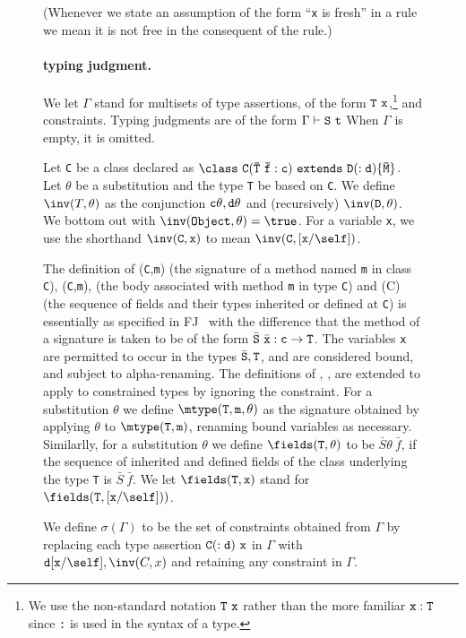 \begin{figure*}
(Whenever we state an assumption of the form ``{\tt x} is
fresh'' in a rule we mean it is not free in the consequent of the
rule.)

\paragraph{\CFJ{} typing judgment.}\label{CFJ-typing}
We let $\Gamma$ stand for multisets of type assertions, of the form
${\tt T\ x}$,\footnote{We use the non-standard notation ${\tt T\ x}$
rather than the more familiar ${\tt x} : {\tt T}$ since {\tt :} is
used in the syntax of a type.}  and constraints. Typing judgments are
of the form $\Gamma\vdash {\tt S\ t}$ When $\Gamma$ is empty, it is
omitted. 

Let {\tt C} be a class declared as ${\tt \class\ C(\bar{\tt T}\
\bar{\tt f}:c)\ extends\ D(:d)\{\bar{\tt M}\}}$. Let
$\theta$ be a substitution and the type {\tt T} be based on {\tt C}.
We define $\inv(T,\theta)$
as the conjunction ${\tt c\theta,d\theta}$ and (recursively)
$\inv({\tt D},\theta)$.  We bottom out with $\inv({\tt
Object},\theta)=\true$. For a variable {\tt x}, we use the shorthand
$\inv({\tt C},{\tt x})$ to mean $\inv({\tt C},[{\tt x}/\self])$.

The definition of {\mtype({\tt C},{\tt m})} (the signature of a method
named {\tt m} in class {\tt C}), {\mbody({\tt C},{\tt m})}, (the body
associated with method {\tt m} in type {\tt C}) and \fields(C) (the
sequence of fields and their types inherited or defined at {\tt C}) is
essentially as specified in FJ~\cite{FJ} with the difference that the
method of a signature is taken to be of the form $\bar{\tt S}\ \bar{\tt
x}: {\tt c} \rightarrow {\tt T}$.  The variables {\tt x} are permitted
to occur in the types $\bar{\tt S},{\tt T}$, and are considered bound,
and subject to alpha-renaming.  The definitions of \mtype, \mbody,
\fields{} are extended to apply to constrained types by ignoring the
constraint.  For a substitution $\theta$ we define $\mtype({\tt
T},{\tt m},\theta)$ as the signature obtained by applying $\theta$ to
$\mtype({\tt T},{\tt m})$, renaming bound variables as necessary.
Similarlly, for a substitution $\theta$ we define $\fields({\tt
T},\theta)$ to be $\bar{S}\theta\ \bar{f}$, if the sequence of
inherited and defined fields of the class underlying the type {\tt T}
is $\bar{S}\ \bar{f}$. We let $\fields({\tt T},{\tt x})$ stand for
$\fields({\tt T},[{\tt x}/\self]))$.

We define $\sigma(\Gamma)$ to be the set of
constraints obtained from $\Gamma$ by replacing each type assertion
${\tt C(:d)\ x}$ in $\Gamma$ with ${\tt d}[{\tt x}/\self],\inv(C,x)$
and retaining any constraint in $\Gamma$.


\end{figure*}
